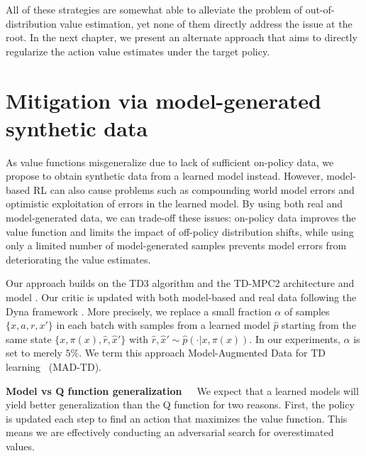 All of these strategies are somewhat able to alleviate the problem of out-of-distribution value estimation, yet none of them directly address the issue at the root.
In the next chapter, we present an alternate approach that aims to directly regularize the action value estimates under the target policy.

\section{Mitigation via model-generated synthetic data}

As value functions misgeneralize due to lack of sufficient on-policy data, we propose to obtain synthetic data from a learned model instead.
However, model-based RL can also cause problems such as compounding world model errors and optimistic exploitation of errors in the learned model. 
By using both real and model-generated data, we can trade-off these issues: on-policy data improves the value function and limits the impact of off-policy distribution shifts, while using only a limited number of model-generated samples prevents model errors from deteriorating the value estimates. 

Our approach builds on the TD3 algorithm \parencite{fujimoto2018addressing} and the TD-MPC2 architecture and model \parencite{hansen2024tdmpc}. 
Our critic is updated with both model-based and real data following the Dyna framework \parencite{dyna}.
More precisely, we replace a small fraction $\alpha$ of samples $\{x,a,r,x'\}$ in each batch with samples from a learned model $\hat{p}$ starting from the same state $\{x, \pi(x), \hat{r} ,\hat{x}'\}$ with $\hat{r}, \hat{x}' \sim \hat{p}(\cdot|x, \pi(x))$. In our experiments, $\alpha$ is set to merely $5\%$.
We term this approach Model-Augmented Data for TD learning ~(MAD-TD).%

\textbf{Model vs Q function generalization}~~~We expect that a learned models will yield better generalization than the Q function for two reasons.
First, the policy is updated each step to find an action that maximizes the value function.
This means we are effectively conducting an adversarial search for overestimated values.

